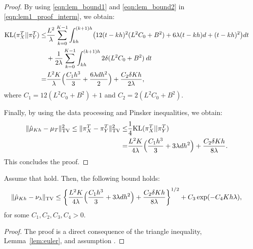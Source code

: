 \begin{proof}
By using \eqref{eqn:lem_bound1} and \eqref{eqn:lem_bound2} in \eqref{eqn:lem1_proof_interm}, we obtain:
\begin{align}
\nonumber \textnormal{KL} (\pi_{X}^T || \pi_{Y}^T) \leq& \frac{L^2}{\lambda} \sum_{k=0}^{K-1} \int_{kh}^{(k+1)h} \bigl(12(t-kh)^2 (L^2 C_0 + B^2) + 6\lambda (t-kh)d +(t-kh)^2 \bigr) dt\\
&+  \frac1{2 \lambda} \sum_{k=0}^{K-1} \int_{kh}^{(k+1)h} 2 \delta(L^2 C_0 + B^2) \> dt \\
=& \frac{L^2 K}{\lambda} \Bigl( \frac{C_1 h^3}{3} + \frac{6 \lambda d h^2}{2} \Bigr) + \frac{C_2 \delta K h}{2\lambda},
\end{align}
where $C_1 = 12(L^2 C_0 + B^2)+1$ and $C_2 = 2 (L^2 C_0 + B^2)$.

Finally, by using the data processing and Pinsker inequalities, we obtain:
\begin{align}
\| \hat{\mu}_{Kh} - \mu_{T} \|_{\textnormal{TV}}^2 \leq \| \pi_{X}^T - \pi_{Y}^T \|_{\textnormal{TV}}^2 \leq& \frac1{4} \textnormal{KL} (\pi_{X}^T || \pi_{Y}^T) \\
=& \frac{L^2 K}{4\lambda} \Bigl( \frac{C_1 h^3}{3} + 3 \lambda d h^2 \Bigr) + \frac{C_2 \delta K h}{8\lambda}.
\end{align}
This concludes the proof.

\end{proof}


\begin{thm}
Assume that  hold. Then, the following bound holds:
\begin{align}
\| \hat{\mu}_{Kh} - \nu_\lambda \|_{\textnormal{TV}} \leq \left \lbrace  \frac{L^2 K}{4\lambda} \Bigl( \frac{C_1 h^3}{3} + 3 \lambda d h^2 \Bigr) + \frac{C_2  \delta K h}{8\lambda} \right \rbrace^{1/2} +  C_3 \exp(-C_4 Kh \lambda),
\end{align}
for some $C_1,C_2,C_3,C_4 > 0$.
\end{thm}
%
\begin{proof}
The proof is a direct consequence of the triangle inequality, Lemma~\ref{lem:euler}, and assumption .
\end{proof}

